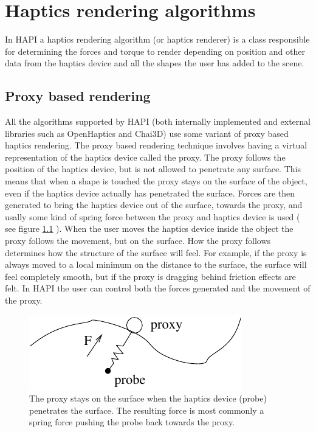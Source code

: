
\chapter {Haptics rendering algorithms}
\label{secHapticsRenderingAlgorithms}
In HAPI a haptics rendering algorithm (or haptics renderer) is a class
responsible for determining the forces and torque to render depending
on position and other data from the haptics device and all the shapes
the user has added to the scene. 

\section{Proxy based rendering}
All the algorithms supported by HAPI (both internally implemented and
external libraries such as OpenHaptics and Chai3D) use some variant of
proxy based haptics rendering. The proxy based rendering technique
involves having a virtual representation of the haptics device called
the proxy. The proxy follows the position of the haptics device, but
is not allowed to penetrate any surface. This means that when a
shape is touched the proxy stays on the surface of the object, even
if the haptics device actually has penetrated the surface. Forces are
then generated to bring the haptics device out of the surface, towards
the proxy, and usally some kind of spring force between the proxy and
haptics device is used ( see figure \ref{Proxy-probe} ). When the user 
moves the haptics device inside
the object the proxy follows the movement, but on the surface. How the
proxy follows determines how the structure of the surface will
feel. For example, if the proxy is always moved to a local minimum on
the distance to the surface, the surface will feel completely smooth,
but if the proxy is dragging behind friction effects are felt. In
HAPI the user can control both the forces generated and the movement
of the proxy.

\begin{figure} 
  \centering 
  \includegraphics{images/proxyfinger.pdf}
  \caption{The proxy stays on the surface when the haptics
  device (probe) penetrates the surface. The resulting force is most
  commonly a spring force pushing the probe back towards the proxy.} 
  \label{Proxy-probe} 
\end{figure}



